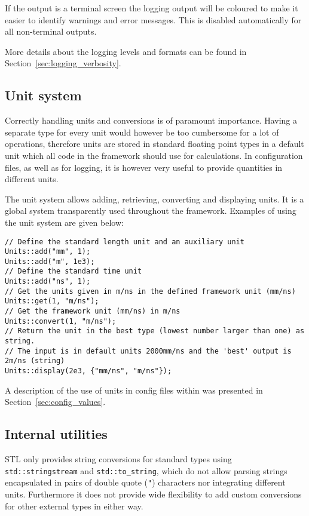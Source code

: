 If the output is a terminal screen the logging output will be coloured to make it easier to identify warnings and error messages.
This is disabled automatically for all non-terminal outputs.

More details about the logging levels and formats can be found in Section~\ref{sec:logging_verbosity}.

\subsection{Unit system}
\label{sec:unit_system}
Correctly handling units and conversions is of paramount importance.
Having a separate \CPP type for every unit would however be too cumbersome for a lot of operations, therefore units are stored in standard \CPP floating point types in a default unit which all code in the framework should use for calculations.
In configuration files, as well as for logging, it is however very useful to provide quantities in different units.

The unit system allows adding, retrieving, converting and displaying units.
It is a global system transparently used throughout the framework.
Examples of using the unit system are given below:
\begin{verbatim}
// Define the standard length unit and an auxiliary unit
Units::add("mm", 1);
Units::add("m", 1e3);
// Define the standard time unit
Units::add("ns", 1);
// Get the units given in m/ns in the defined framework unit (mm/ns)
Units::get(1, "m/ns");
// Get the framework unit (mm/ns) in m/ns
Units::convert(1, "m/ns");
// Return the unit in the best type (lowest number larger than one) as string.
// The input is in default units 2000mm/ns and the 'best' output is 2m/ns (string)
Units::display(2e3, {"mm/ns", "m/ns"});
\end{verbatim}

A description of the use of units in config files within \apsq was presented in Section~\ref{sec:config_values}.

\subsection{Internal utilities}
\label{sec:string_utilities}
STL only provides string conversions for standard types using \texttt{std::stringstream} and \texttt{std::to\_string}, which do not allow parsing strings encapsulated in pairs of double quote (\texttt{"}) characters nor integrating different units.
Furthermore it does not provide wide flexibility to add custom conversions for other external types in either way.

